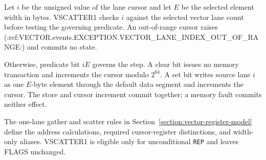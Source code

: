 Let $i$ be the unsigned value of the lane cursor and let $E$ be the selected
element width in bytes.  VSCATTER1 checks $i$ against the selected vector lane
count before testing the governing predicate.  An out-of-range cursor raises
(:ref:VECTOR.events.EXCEPTION.VECTOR_LANE_INDEX_OUT_OF_RANGE:) and commits no state.

Otherwise, predicate bit $iE$ governs the step.  A clear bit issues no memory
transaction and increments the cursor modulo $2^{64}$.  A set bit writes source
lane $i$ as one $E$-byte element through the default data segment and increments
the cursor.  The store and cursor increment commit together; a memory fault
commits neither effect.

The one-lane gather and scatter rules in
Section~\ref{section:vector-register-model} define the address calculations,
required cursor-register distinctions, and width-only aliases.  VSCATTER1 is
eligible only for unconditional \texttt{REP} and leaves FLAGS unchanged.
